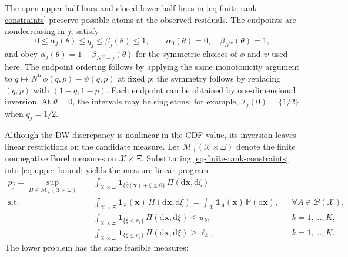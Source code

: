 \documentclass[review,11pt,3p,authoryear,nopreprintline]{elsarticle}
\begin{document}
The open upper half-lines and closed lower half-lines in \eqref{eq-finite-rank-constraints} preserve possible atoms at the observed residuals. The endpoints are nondecreasing in $j$, satisfy
\[
  0\le\alpha_j(\theta)\le q_j\le\beta_j(\theta)\le1,
  \qquad
  \alpha_0(\theta)=0,\quad\beta_{N^{\mathrm{te}}}(\theta)=1,
\]
and obey $\alpha_j(\theta)=1-\beta_{N^{\mathrm{te}}-j}(\theta)$ for the symmetric choices of $\phi$ and $\psi$ used here. The endpoint ordering follows by applying the same monotonicity argument to $q\mapsto N^{\mathrm{te}}\phi(q,p)-\psi(q,p)$ at fixed $p$; the symmetry follows by replacing $(q,p)$ with $(1-q,1-p)$. Each endpoint can be obtained by one-dimensional inversion. At $\theta=0$, the intervals may be singletons; for example, $\mathcal I_j(0)=\{1/2\}$ when $q_j=1/2$.

Although the DW discrepancy is nonlinear in the CDF value, its inversion leaves linear restrictions on the candidate measure. Let $\mathcal M_+(\mathcal X\times\Xi)$ denote the finite nonnegative Borel measures on $\mathcal X\times\Xi$. Substituting \eqref{eq-finite-rank-constraints} into \eqref{eq-upper-bound} yields the measure linear program
\begin{equation}
  \begin{aligned}
    \overline p_{\hat f}
    =\sup_{\Pi\in\mathcal M_+(\mathcal X\times\Xi)}\quad&
    \int_{\mathcal X\times\Xi}
    \mathbf1_{\{\hat g(\bm x)+\xi\le0\}}\,\Pi\left(\mathrm d\bm x,\mathrm d\xi\right)\\
    \text{s.t.}\quad&
    \int_{\mathcal X\times\Xi}\mathbf1_A(\bm x)\,\Pi\left(\mathrm d\bm x,\mathrm d\xi\right)
    =\int_{\mathcal X}\mathbf1_A(\bm x)\,\mathbb P\left(\mathrm d\bm x\right),
    &&\forall A\in\mathcal B(\mathcal X),\\
    &\int_{\mathcal X\times\Xi}
    \mathbf1_{\{\xi<r_k\}}\,\Pi\left(\mathrm d\bm x,\mathrm d\xi\right)\le u_k,
    &&k=1,\ldots,K,\\
    &\int_{\mathcal X\times\Xi}
    \mathbf1_{\{\xi\le r_k\}}\,\Pi\left(\mathrm d\bm x,\mathrm d\xi\right)\ge\ell_k,
    &&k=1,\ldots,K.
  \end{aligned}
  \label{eq-measure-upper}
\end{equation}
The lower problem has the same feasible measures:
\end{document}
